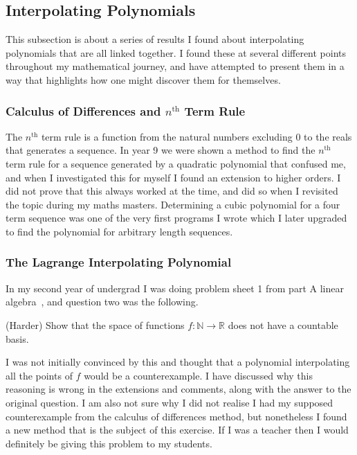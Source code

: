 \subsection{Interpolating Polynomials}

This subsection is about a series of results I found about interpolating polynomials that are all linked together. I found these at several different points throughout my mathematical journey, and have attempted to present them in a way that highlights how one might discover them for themselves.

\subsubsection{Calculus of Differences and $n^\text{th}$ Term Rule}

The $n^\text{th}$ term rule is a function from the natural numbers excluding 0 to the reals that generates a sequence. In year 9 we were shown a method to find the $n^\text{th}$ term rule for a sequence generated by a quadratic polynomial that confused me, and when I investigated this for myself I found an extension to higher orders. I did not prove that this always worked at the time, and did so when I revisited the topic during my maths masters. Determining a cubic polynomial for a four term sequence was one of the very first programs I wrote which I later upgraded to find the polynomial for arbitrary length sequences.



\subsubsection{The Lagrange Interpolating Polynomial}

In my second year of undergrad I was doing problem sheet 1 from part A linear algebra~\cite{PartALinearAlgebraSheet1}, and question two was the following.

\begin{center}
    (Harder) Show that the space of functions $f : \mathbb{N} \to \mathbb{R}$ does not have a countable basis.
\end{center}

I was not initially convinced by this and thought that a polynomial interpolating all the points of $f$ would be a counterexample. I have discussed why this reasoning is wrong in the extensions and comments, along with the answer to the original question. I am also not sure why I did not realise I had my supposed counterexample from the calculus of differences method, but nonetheless I found a new method that is the subject of this exercise. If I was a teacher then I would definitely be giving this problem to my students.

